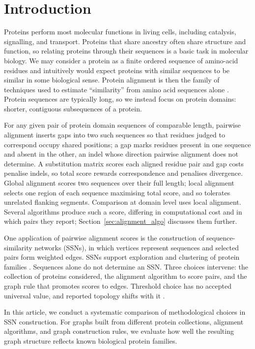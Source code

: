 \documentclass[11pt,a4paper]{article}
\begin{document}
\section{Introduction}

Proteins perform most molecular functions in living cells, including
catalysis, signalling, and transport. Proteins that share ancestry often share
structure and function, so relating proteins through their sequences is a basic
task in molecular biology.
We may consider a protein as a finite ordered sequence of amino-acid residues and
intuitively would expect proteins with similar sequences to be similar in some biological sense.
Protein alignment is then the family of techniques used to estimate ``similarity'' from amino acid
sequences alone \citep{durbin1998biological}. Protein sequences are typically long, so
we instead focus on protein domains: shorter, contiguous subsequences of a protein.

For any given pair of protein domain sequences of comparable length,
pairwise alignment inserts gaps into two such sequences so that residues judged
to correspond occupy shared positions; a gap marks residues present in one
sequence and absent in the other, an indel whose direction pairwise alignment
does not determine. A substitution matrix scores each aligned residue pair and
gap costs penalise indels, so total score rewards correspondence and penalises
 divergence. Global alignment scores two sequences over their full length;
local alignment selects one region of each sequence maximising total score, and
so tolerates unrelated flanking segments. Comparison at domain level uses local
alignment. Several algorithms produce such a score, differing in computational cost and in
which pairs they report; Section~\ref{sec:alignment_algo} discusses them further.

One application of pairwise alignment scores is the construction of
sequence-similarity networks (SSNs), in which vertices represent sequences and
selected pairs form weighted edges. SSNs support exploration and
clustering of protein families
\citep{atkinson2009sequence,gerlt2015efi,enright2002mcl}. Sequences alone do
not determine an SSN. Three choices intervene: the collection of proteins considered,
the alignment algorithm to score pairs, and the graph rule that promotes scores
to edges. Threshold choice has no accepted universal value, and reported
topology shifts with it \citep{apeltsin2011threshold,hornung2023objective}.

\medskip
In this article, we conduct a systematic comparison of methodological choices
in SSN construction. For graphs built from different protein collections,
alignment algorithms, and graph construction rules, we evaluate how well the
resulting graph structure reflects known biological protein families.
\end{document}
